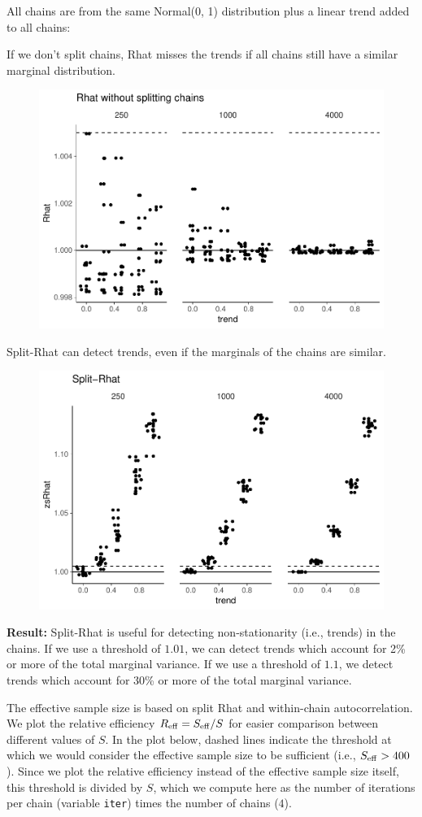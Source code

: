 \documentclass[american,]{article}
\begin{document}
All chains are from the same Normal(0, 1) distribution plus a linear
trend added to all chains:

If we don't split chains, Rhat misses the trends if all chains still
have a similar marginal distribution.

\begin{figure}[tp]
  \centering
  \includegraphics[width=0.6\linewidth]{graphics/rhat-same-trend-1.pdf}
\end{figure}

Split-Rhat can detect trends, even if the marginals of the chains are
similar.

\begin{figure}[tp]
  \centering
  \includegraphics[width=0.6\linewidth]{graphics/zsrhat-same-trend-1.pdf}
\end{figure}

\textbf{Result:} Split-Rhat is useful for detecting non-stationarity
(i.e., trends) in the chains. If we use a threshold of \(1.01\), we can
detect trends which account for 2\% or more of the total marginal
variance. If we use a threshold of \(1.1\), we detect trends which
account for 30\% or more of the total marginal variance.

The effective sample size is based on split Rhat and within-chain
autocorrelation. We plot the relative efficiency
\(R_{\rm eff}=S_{\rm eff}/S\) for easier comparison between different
values of \(S\). In the plot below, dashed lines indicate the threshold
at which we would consider the effective sample size to be sufficient
(i.e., \(S_{\rm eff} > 400\)). Since we plot the relative efficiency
instead of the effective sample size itself, this threshold is divided
by \(S\), which we compute here as the number of iterations per chain
(variable \texttt{iter}) times the number of chains (\(4\)).
\end{document}
